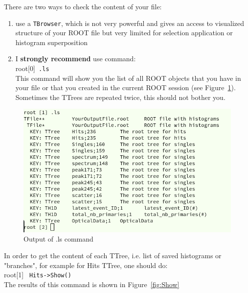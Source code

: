 \documentclass[12pt]{article}
\begin{document}
There are two ways to check the content of your file:
\begin{enumerate}
\item use a \verb|TBrowser|, which is not very powerful and gives an access to visualized structure of your ROOT file but very limited for selection application or histogram superposition
\item I \textbf{strongly recommend} use command:\\

root[0]\verb| .ls|\\

This command will show you the list of all ROOT objects that you have in your file or that you created in the current ROOT session (see Figure~\ref{fig:.ls}). Sometimes the TTrees are repeated twice, this should not bother you. 
\end{enumerate}
\begin{figure}[h]
\centering
\includegraphics[scale=0.5]{figs/ls.png}
\caption{Output of .ls command}
\label{fig:.ls}
\end{figure}
\clearpage
In order to get the content of each TTree, i.e. list of saved histograms
or "branches", for example for Hits TTree, one should do:\\

root[1] \verb| Hits->Show()| \\

The results of this command is shown in Figure~\ref{fig:Show}
\end{document}
